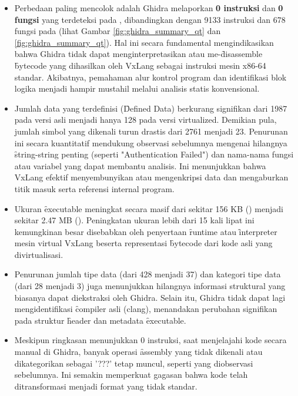 \begin{itemize}
    \item {} Perbedaan paling mencolok adalah Ghidra melaporkan \textbf{0 instruksi} dan \textbf{0 fungsi} yang terdeteksi pada , dibandingkan dengan 9133 instruksi dan 678 fungsi pada  (lihat Gambar \ref{fig:ghidra_summary_qt} dan \ref{fig:ghidra_summary_qt}). Hal ini secara fundamental mengindikasikan bahwa Ghidra tidak dapat menginterpretasikan atau me-\f{disassemble} \f{bytecode} yang dihasilkan oleh VxLang sebagai instruksi mesin x86-64 standar. Akibatnya, pemahaman alur kontrol program dan identifikasi blok logika menjadi hampir mustahil melalui analisis statis konvensional.

    \item {} Jumlah data yang terdefinisi (\f{Defined Data}) berkurang signifikan dari 1987 pada versi asli menjadi hanya 128 pada versi virtualized. Demikian pula, jumlah simbol yang dikenali turun drastis dari 2761 menjadi 23. Penurunan ini secara kuantitatif mendukung observasi sebelumnya mengenai hilangnya \f{string-string} penting (seperti "Authentication Failed") dan nama-nama fungsi atau variabel yang dapat membantu analisis. Ini menunjukkan bahwa VxLang efektif menyembunyikan atau mengenkripsi data dan mengaburkan titik masuk serta referensi internal program.

    \item {} Ukuran \f{executable} meningkat secara masif dari sekitar 156 KB () menjadi sekitar 2.47 MB (). Peningkatan ukuran lebih dari 15 kali lipat ini kemungkinan besar disebabkan oleh penyertaan \f{runtime} atau \f{interpreter} mesin virtual VxLang beserta representasi \f{bytecode} dari kode asli yang divirtualisasi.

    \item {} Penurunan jumlah tipe data (dari 428 menjadi 37) dan kategori tipe data (dari 28 menjadi 3) juga menunjukkan hilangnya informasi struktural yang biasanya dapat diekstraksi oleh Ghidra. Selain itu, Ghidra tidak dapat lagi mengidentifikasi \f{compiler} asli (clang), menandakan perubahan signifikan pada struktur \f{header} dan metadata \f{executable}.

    \item {} Meskipun ringkasan menunjukkan 0 instruksi, saat menjelajahi kode secara manual di Ghidra, banyak operasi \f{assembly} yang tidak dikenali atau dikategorikan sebagai '???' tetap muncul, seperti yang diobservasi sebelumnya. Ini semakin memperkuat gagasan bahwa kode telah ditransformasi menjadi format yang tidak standar.
\end{itemize}

